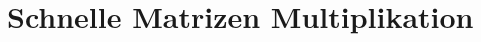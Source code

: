 %
%
%
\chapter{Schnelle Matrizen Multiplikation\label{chapter:multiplikation}}
\begin{refsection}






\printbibliography[heading=subbibliography]
\end{refsection}
